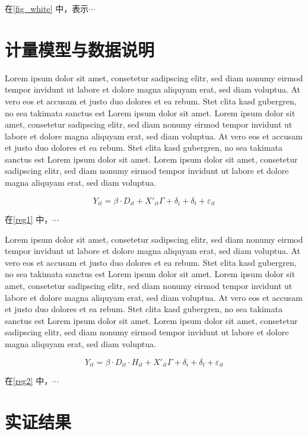 \documentclass[]{WTUthesis}
\begin{document}
	在\cref{fig_white} 中，表示$\cdots$
	
	\chapter{计量模型与数据说明}
	
	Lorem ipsum dolor sit amet, consetetur sadipscing elitr, sed diam nonumy eirmod tempor invidunt ut labore et dolore magna aliquyam erat, sed diam voluptua. At vero eos et accusam et justo duo dolores et ea rebum. Stet clita kasd gubergren, no sea takimata sanctus est Lorem ipsum dolor sit amet. Lorem ipsum dolor sit amet, consetetur sadipscing elitr, sed diam nonumy eirmod tempor invidunt ut labore et dolore magna aliquyam erat, sed diam voluptua. At vero eos et accusam et justo duo dolores et ea rebum. Stet clita kasd gubergren, no sea takimata sanctus est Lorem ipsum dolor sit amet. Lorem ipsum dolor sit amet, consetetur sadipscing elitr, sed diam nonumy eirmod tempor invidunt ut labore et dolore magna aliquyam erat, sed diam voluptua.
	
	\begin{equation}\label{reg1}
		Y_{it}=\beta\cdot D_{it}+X'_{it}\Gamma+\delta_{i}+\delta_t+\varepsilon_{it}
	\end{equation}
	
	在\cref{reg1} 中，$\cdots$
	
	\newpage
	
	Lorem ipsum dolor sit amet, consetetur sadipscing elitr, sed diam nonumy eirmod tempor invidunt ut labore et dolore magna aliquyam erat, sed diam voluptua. At vero eos et accusam et justo duo dolores et ea rebum. Stet clita kasd gubergren, no sea takimata sanctus est Lorem ipsum dolor sit amet. Lorem ipsum dolor sit amet, consetetur sadipscing elitr, sed diam nonumy eirmod tempor invidunt ut labore et dolore magna aliquyam erat, sed diam voluptua. At vero eos et accusam et justo duo dolores et ea rebum. Stet clita kasd gubergren, no sea takimata sanctus est Lorem ipsum dolor sit amet. Lorem ipsum dolor sit amet, consetetur sadipscing elitr, sed diam nonumy eirmod tempor invidunt ut labore et dolore magna aliquyam erat, sed diam voluptua.
	
	\begin{equation}\label{reg2}
		Y_{it}=\beta\cdot D_{it}\cdot H_{it}+X'_{it}\Gamma+\delta_{i}+\delta_t+\varepsilon_{it}
	\end{equation}
	
	在\cref{reg2} 中，$\cdots$
	
	\chapter{实证结果}
	
\end{document}
